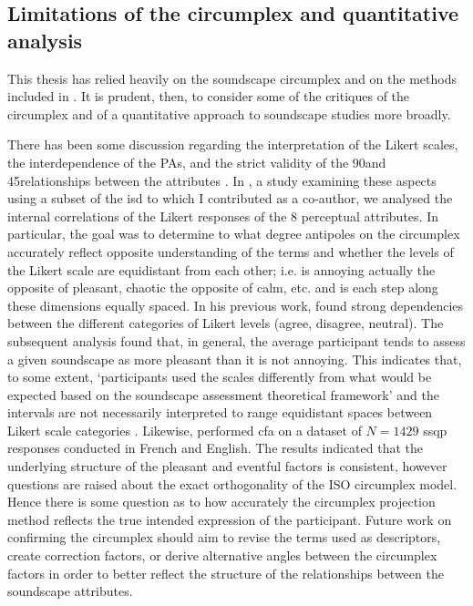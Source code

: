 \subsection{Limitations of the circumplex and quantitative analysis}

This thesis has relied heavily on the soundscape circumplex and on the methods included in \cite{ISO12913Part2}. It is prudent, then, to consider some of the critiques of the circumplex and of a quantitative approach to soundscape studies more broadly.

There has been some discussion regarding the interpretation of the Likert scales, the interdependence of the PAs, and the strict validity of the 90\textdegree and 45\textdegree relationships between the attributes \citep{Lionello2021Thesis, Tarlao2020Investigating}. In \citet{Lionello2021Introducing}, a study examining these aspects using a subset of the \gls{isd} to which I contributed as a co-author, we analysed the internal correlations of the Likert responses of the 8 perceptual attributes. In particular, the goal was to determine to what degree antipoles on the circumplex accurately reflect opposite understanding of the terms and whether the levels of the Likert scale are equidistant from each other; i.e. is annoying actually the opposite of pleasant, chaotic the opposite of calm, etc. and is each step along these dimensions equally spaced. In his previous work, \citet{Lionello2019dimension} found strong dependencies between the different categories of Likert levels (agree, disagree, neutral). The subsequent analysis found that, in general, the average participant tends to assess a given soundscape as more pleasant than it is not annoying. This indicates that, to some extent, `participants used the scales differently from what would be expected based on the soundscape assessment theoretical framework' and the intervals are not necessarily interpreted to range equidistant spaces between Likert scale categories \citep{Lionello2021Introducing}. Likewise, \citet{Tarlao2020Investigating} performed \gls{cfa} on a dataset of $N=1429$ \gls{ssqp} responses conducted in French and English. The results indicated that the underlying structure of the pleasant and eventful factors is consistent,  however questions are raised about the exact orthogonality of the ISO circumplex model. Hence there is some question as to how accurately the circumplex projection method reflects the true intended expression of the participant. Future work on confirming the circumplex should aim to revise the terms used as descriptors, create correction factors, or derive alternative angles between the circumplex factors in order to better reflect the structure of the relationships between the soundscape attributes.

